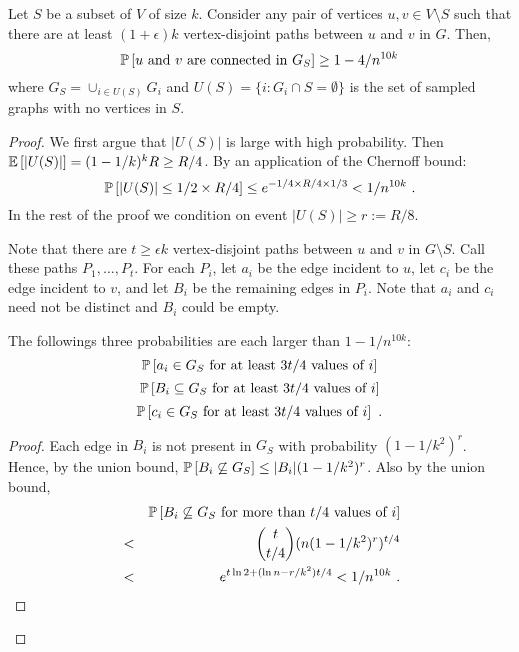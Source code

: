 \begin{theorem}\label{thm:everyonesgonetosleep}
Let $S$ be a subset of $V$ of size $k$. Consider any pair of vertices $u,v\in V\setminus S$ such that there are at least $(1+\epsilon)k$ vertex-disjoint paths between $u$ and $v$ in $G$. Then, 
\[\mathbb P \left [ u \mbox{ and }v \mbox{ are connected in } G_S \right ]\geq 1-4/n^{10k}\] 
where $G_S=\cup_{i\in U(S)} G_i$ and $U(S)=\{i:G_i\cap S=\emptyset\}$ is the set of sampled graphs with no vertices in $S$. 
\end{theorem}
\begin{proof}
We first argue that $|U(S)|$ is large with high probability. Then $\mathbb E\left [ |U(S)| \right ]=(1-1/k)^{k} R \geq R/4$. By an application of the Chernoff bound:
\[
\mathbb P \left [ |U(S)|\leq 1/2\times R/4 \right ]\leq  e^{-1/4\times R/4 \times 1/3}<1/n^{10k} \ .
\]
In the rest of the proof we condition on event $|U(S)|\geq r:=R/8$.

Note that there are $t\geq \epsilon k$ vertex-disjoint paths between $u$ and $v$ in $G\setminus S$. Call these paths $P_1, \ldots, P_{t}$. For each $P_i$, let $a_i$ be the edge incident to $u$, let $c_i$ be the edge incident to $v$, and let $B_i$ be the remaining edges in $P_i$. Note that $a_i$ and $c_i$ need not be distinct and $B_i$ could be empty.

\begin{claim} The followings three probabilities are each larger than $1-1/n^{10k}$:
\[
\mathbb P \left [ a_i \in G_S \mbox{ for at least $3t/4$ values of $i$} \right ]\]
\[\mathbb P \left [ B_i \subseteq G_S \mbox{ for at least $3t/4$ values of $i$} \right ]\]
\[\mathbb P \left [ c_i \in G_S \mbox{ for at least $3t/4$ values of $i$} \right ] \ .
\]
%
\end{claim}
\begin{proof}
Each edge in $B_i$ is not present in $G_S$ with probability $(1-1/k^2)^{r}$. Hence, by the union bound,
$\mathbb P \left [ B_i\not \subseteq G_S \right ]\leq |B_i| (1-1/k^2)^{r}$.
Also by the union bound,
\begin{eqnarray*}
& & \mathbb P \left [ B_i \not \subseteq G_S \mbox{ for more than $t/4$ values of $i$} \right ]
\\ &<&   {t\choose t/4} (n (1-1/k^2)^{r})^{t/4} \\
&< &  e^{t \ln 2+(\ln n-r/k^2)t/4}<1/n^{10k} \ .
\end{eqnarray*}


\end{proof}
\end{proof}
